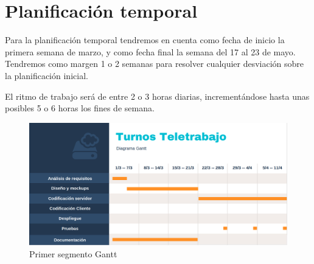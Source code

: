 \documentclass[11pt,spanish,listoffigures,listoftables]{tfgetsinf}
\begin{document}
\section{Planificación temporal}
Para la planificación temporal tendremos en cuenta como fecha de inicio la primera semana de marzo, y como fecha final la semana del 17 al 23 de mayo.
Tendremos como margen 1 o 2 semanas para resolver cualquier desviación sobre la planificación inicial.

El ritmo de trabajo será de entre 2 o 3 horas diarias, incrementándose hasta unas posibles 5 o 6 horas los fines de semana. 

\begin{figure}[h!] %
   \includegraphics[width=\linewidth]{img/gantt1.png}
   \caption{Primer segmento Gantt}
   \label{fig:Gantt1}
 \end{figure}
\end{document}
